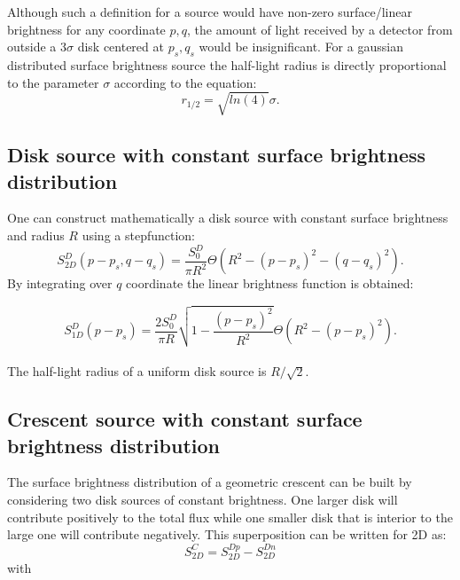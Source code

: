 \documentclass[usenatbib]{mn2e}
\begin{document}
Although such a definition for a source would have non-zero surface/linear brightness for any coordinate $p,q$, the amount of light received by a detector from outside a $3 \sigma$ disk centered at $p_s, q_s$ 
would be insignificant. For a gaussian distributed surface brightness source the half-light radius is directly proportional to the parameter $\sigma$ according to the equation:
\begin{equation}
r_{1/2} = \sqrt{ln(4)} \sigma.
\end{equation}

\subsection{Disk source with constant surface brightness distribution}

One can construct mathematically a disk source with constant surface brightness and radius $R$ using a stepfunction:
\begin{equation}
 S_{2D}^D(p-p_s, q-q_s) = \frac{S_0^D}{\pi R^2} \Theta \left( R^2 - \left( p-p_s \right)^2 - \left( q-q_s \right)^2 \right).
\end{equation}
By integrating over $q$ coordinate the linear brightness function is obtained:


\begin{equation}
 S_{1D}^D(p-p_s) = \frac{2 S_0^D}{\pi R}  \sqrt{1 - \frac{(p-p_s)^2}{R^2} }    \Theta \left( R^2 - \left( p-p_s \right)^2 \right).
\end{equation}
\\
The half-light radius of a uniform disk source is $R/\sqrt{2}$.

\subsection{Crescent source with constant surface brightness distribution}\label{subsec:crescent}

The surface brightness distribution of a geometric crescent can be built by considering two disk sources of constant brightness. One larger disk will contribute positively to the total flux while one smaller disk 
that is interior to the large one will contribute negatively. This superposition can be written for 2D as:\\

\begin{equation}
 S_{2D}^C =  S_{2D}^{Dp} -  S_{2D}^{Dn}  
 \label{eqn:s2d}
\end{equation}
with\\
\end{document}
